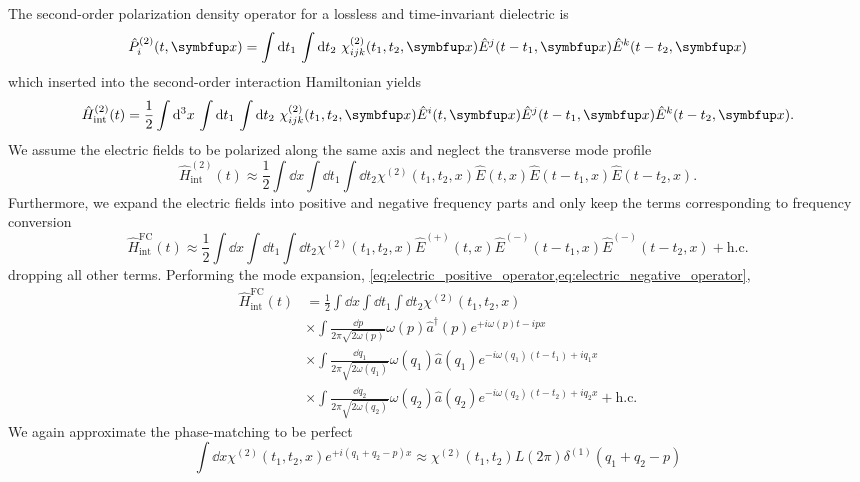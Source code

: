 The second-order polarization density operator for a lossless and time-invariant dielectric is
\begin{equation}
	\hat{P}_i^{(2)}(t,\vb{x})
	=
	\int\dd{t_1}
	\int\dd{t_2}
	\chi^{(2)}_{ijk}(t_1,t_2,\vb{x})
	\hat{E}^j(t-t_1,\vb{x})
	\hat{E}^k(t-t_2,\vb{x})
\end{equation}
which inserted into the second-order interaction Hamiltonian yields
\begin{equation}
	\hat{H}_\text{int}^{(2)}(t)
	=
	\frac{1}{2}
	\int\dd[3]{x}
	\int\dd{t_1}
	\int\dd{t_2}
	\chi^{(2)}_{ijk}(t_1,t_2,\vb{x})
	\hat{E}^i(t,\vb{x})
	\hat{E}^j(t-t_1,\vb{x})
	\hat{E}^k(t-t_2,\vb{x})
	.
\end{equation}
We assume the electric fields to be polarized along the same axis and neglect the transverse mode profile
\begin{equation}
	\hat{H}_\text{int}^{(2)}(t)
	\approx
	\frac{1}{2}
	\int\dd{x}
	\int\dd{t_1}
	\int\dd{t_2}
	\chi^{(2)}(t_1,t_2,x)
	\hat{E}(t,x)
	\hat{E}(t-t_1,x)
	\hat{E}(t-t_2,x)
	.
\end{equation}
Furthermore, we expand the electric fields into positive and negative frequency parts and only keep the terms corresponding to frequency conversion
\begin{equation}
	\hat{H}_\text{int}^\text{FC}(t)
	\approx
	\frac{1}{2}
	\int\dd{x}
	\int\dd{t_1}
	\int\dd{t_2}
	\chi^{(2)}(t_1,t_2,x)
	\hat{E}^{(+)}(t,x)
	\hat{E}^{(-)}(t-t_1,x)
	\hat{E}^{(-)}(t-t_2,x)
	+
	\text{h.c.}
\end{equation}
dropping all other terms.
Performing the mode expansion, \cref{eq:electric_positive_operator,eq:electric_negative_operator},
\begin{equation}
	\begin{split}
		\hat{H}_\text{int}^\text{FC}(t)
		&=
		\frac{1}{2}
		\int\dd{x}
		\int\dd{t_1}
		\int\dd{t_2}
		\chi^{(2)}(t_1,t_2,x)
		\\
		&\times
		\int\frac{\dd{p}}{2\pi\sqrt{2\omega(p)}}
		\omega(p)
		\hat{a}^\dagger(p)
		e^{+i\omega(p)t-ipx}
		\\
		&\times
		\int\frac{\dd{q_1}}{2\pi\sqrt{2\omega(q_1)}}
		\omega(q_1)
		\hat{a}(q_1)
		e^{-i\omega(q_1)(t-t_1)+iq_1x}
		\\
		&\times
		\int\frac{\dd{q_2}}{2\pi\sqrt{2\omega(q_2)}}
		\omega(q_2)
		\hat{a}(q_2)
		e^{-i\omega(q_2)(t-t_2)+iq_2x}
		+
		\text{h.c.}
	\end{split}
\end{equation}
We again approximate the phase-matching to be perfect
\begin{equation}
	\int\dd{x}
	\chi^{(2)}(t_1,t_2,x)
	e^{+i(q_1+q_2-p)x}
	\approx
	\chi^{(2)}(t_1,t_2)L
	(2\pi)
	\delta^{(1)}(q_1+q_2-p)
\end{equation}
